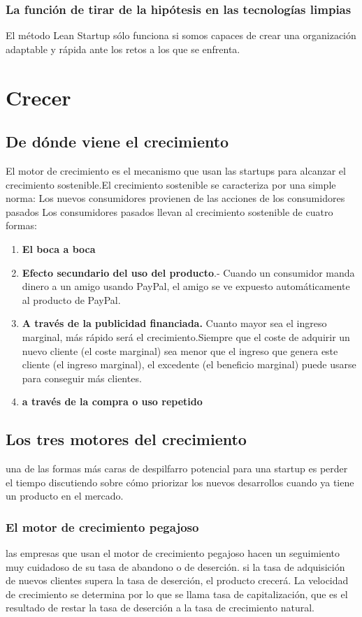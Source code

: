 \documentclass[10pt]{article}
\begin{document}
\begin{multicols}{2}
\subsubsection*{La función de tirar de la hipótesis en las tecnologías limpias}
{\color{red}El método Lean Startup sólo funciona si somos capaces de crear una organización adaptable y rápida ante los retos a los que se enfrenta.}
\section*{Crecer}
\subsection*{De dónde viene el crecimiento}
{\color{blue} El motor de crecimiento es el mecanismo que usan las startups para alcanzar el crecimiento sostenible.El crecimiento sostenible se caracteriza por una simple norma: Los nuevos consumidores provienen de las acciones de los consumidores pasados}
Los consumidores pasados llevan al crecimiento sostenible de cuatro formas:
\begin{enumerate}[\bfseries 1.]
\item \textbf{El boca a boca}
\item \textbf{Efecto secundario del uso del producto}.- Cuando un consumidor manda dinero a un amigo usando PayPal, el amigo se ve expuesto automáticamente al producto de PayPal.
\item \textbf{A través de la publicidad financiada.} Cuanto mayor sea el ingreso marginal, más rápido será el crecimiento.Siempre que el coste de adquirir un nuevo cliente (el coste marginal) sea menor que el ingreso que genera este cliente (el ingreso marginal), el excedente (el beneficio marginal) puede usarse para conseguir más clientes. 
\item \textbf{a través de la compra o uso repetido}
\end{enumerate}
\subsection*{Los tres motores del crecimiento}
 una de las formas más caras de despilfarro potencial para una startup es perder el tiempo discutiendo sobre cómo priorizar los nuevos desarrollos cuando ya tiene un producto en el mercado.
\subsubsection*{El motor de crecimiento pegajoso}
las empresas que usan el motor de crecimiento pegajoso hacen un seguimiento muy cuidadoso de su tasa de abandono o de deserción. {\color{blue}si la tasa de adquisición de nuevos clientes supera la tasa de deserción, el producto crecerá. La velocidad de crecimiento se determina por lo que se llama tasa de capitalización, que es el resultado de restar la tasa de deserción a la tasa de crecimiento natural.} 

\end{multicols}
\end{document}
